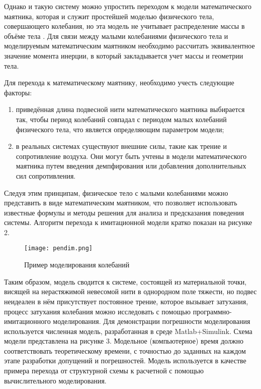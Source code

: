 {\begin{onehalfspace}
    Однако и такую систему можно упростить переходом к модели математического маятника, которая и служит простейшей моделью физического тела, совершающего колебания, но эта модель не учитывает распределение массы в объёме тела \cite{maytnik29}. Для связи между малыми колебаниями физического тела и моделируемым математическим маятником необходимо рассчитать эквивалентное значение момента инерции, в который закладывается учет массы и геометрии тела.


    Для перехода к математическому маятнику, необходимо учесть следующие факторы:

\begin{enumerate} 
\item  приведённая длина подвесной нити  математического маятника выбирается так, чтобы период колебаний совпадал с периодом малых колебаний физического тела, что является определяющим параметром модели;


\item  в реальных системах существуют внешние силы, такие как трение и сопротивление воздуха. Они могут быть учтены в модели математического маятника путем введения демпфирования или добавления дополнительных сил сопротивления.

\end{enumerate}


Следуя этим принципам, физическое тело с малыми колебаниями можно представить в виде математическим маятником, что позволяет использовать известные формулы и методы решения для анализа и предсказания поведения системы. Алгоритм перехода к имитационной модели кратко показан на рисунке 2.

 
 
	\begin{center}
		\begin{figure}[h]
			\centering
				\texttt{[image: pendim.png]}
			\caption{Пример моделирования колебаний}
			\label{fig:model3}
		\end{figure}
	\end{center}
 

   
 
 Таким образом, модель сводится к системе, состоящей из материальной точки, висящей на нерастяжимой невесомой нити в однородном поле тяжести, но подвес неидеален в нём присутствует постоянное трение, которое вызывает затухания, процесс затухания колебания можно исследовать с помощью программно-имитационного моделирования. Для демонстрации погрешности моделирования используется численная модель, разработанная в среде Matlab+Simulink. Схема модели представлена на рисунке 3. Модельное (компьютерное) время должно соответствовать теоретическому времени, с точностью до заданных на каждом этапе разработки допущений и погрешностей. Модель используется в качестве примера перехода от структурной схемы к расчетной с помощью вычислительного моделирования. 



\end{onehalfspace}}
